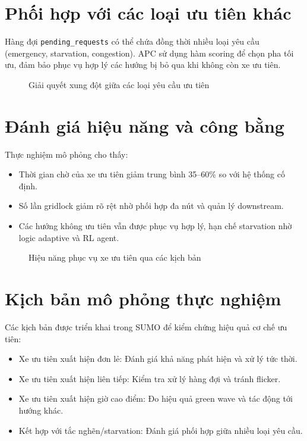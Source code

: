 \section{Phối hợp với các loại ưu tiên khác}

Hàng đợi \texttt{pending\_requests} có thể chứa đồng thời nhiều loại yêu cầu (emergency, starvation, congestion). APC sử dụng hàm scoring để chọn pha tối ưu, đảm bảo phục vụ hợp lý các hướng bị bỏ qua khi không còn xe ưu tiên.

\begin{figure}[H]
    \centering
    \caption{Giải quyết xung đột giữa các loại yêu cầu ưu tiên}
\end{figure}

\section{Đánh giá hiệu năng và công bằng}

Thực nghiệm mô phỏng cho thấy:
\begin{itemize}
    \item Thời gian chờ của xe ưu tiên giảm trung bình 35--60\% so với hệ thống cố định.
    \item Số lần gridlock giảm rõ rệt nhờ phối hợp đa nút và quản lý downstream.
    \item Các hướng không ưu tiên vẫn được phục vụ hợp lý, hạn chế starvation nhờ logic adaptive và RL agent.
\end{itemize}

\begin{figure}[H]
    \centering
    \caption{Hiệu năng phục vụ xe ưu tiên qua các kịch bản}
\end{figure}

\section{Kịch bản mô phỏng thực nghiệm}

Các kịch bản được triển khai trong SUMO để kiểm chứng hiệu quả cơ chế ưu tiên:
\begin{itemize}
    \item Xe ưu tiên xuất hiện đơn lẻ: Đánh giá khả năng phát hiện và xử lý tức thời.
    \item Xe ưu tiên xuất hiện liên tiếp: Kiểm tra xử lý hàng đợi và tránh flicker.
    \item Xe ưu tiên xuất hiện giờ cao điểm: Đo hiệu quả green wave và tác động tới hướng khác.
    \item Kết hợp với tắc nghẽn/starvation: Đánh giá phối hợp giữa nhiều loại yêu cầu.
\end{itemize}

